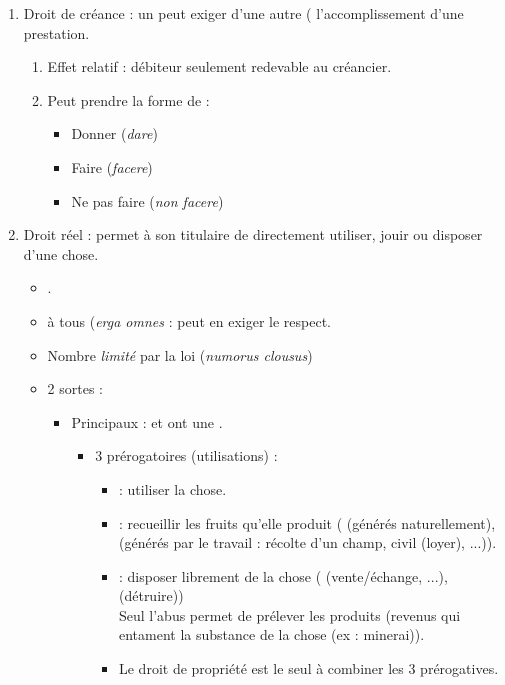 \begin{enumerate}
	\item Droit de créance : un  peut exiger d'une autre ( l'accomplissement d'une prestation.
	\begin{enumerate}
		\item Effet relatif : débiteur seulement redevable au créancier.
		\item Peut prendre la forme de :
		\begin{itemize}
			\item Donner (\textit{dare})
			\item Faire (\textit{facere})
			\item Ne pas faire (\textit{non facere})
		\end{itemize}
	\end{enumerate}
	\item Droit réel : permet à son titulaire de directement utiliser, jouir ou disposer d'une chose.
	\begin{itemize}
		\item {}.
	    \item {} à tous (\textit{erga omnes} : peut en exiger le respect.
	    \item Nombre \textit{limité} par la loi (\textit{numorus clousus})
	    \item 2 sortes :
	    \begin{itemize}
	    	    \item Principaux :  et ont une .
	    	    \begin{itemize}
	    	    	    \item 3 prérogatoires (utilisations) :
	    	    	    \begin{itemize}
	    	    	    	    \item {} : utiliser la chose.
	    	    	    	    \item {} : recueillir les fruits qu'elle produit ( (générés naturellement),  (générés par le travail : récolte d'un champ, civil (loyer), ...)).
	    	    	    	    \item {} : disposer librement de la chose ( (vente/échange, ...),  (détruire))\\
	    	    	    	    \textred{!} Seul l'abus permet de prélever les produits (revenus qui entament la substance de la chose (ex : minerai)).
	    	    	    	    \item Le droit de propriété est le seul à combiner les 3 prérogatives.

\end{itemize}
\end{itemize}
\end{itemize}
\end{itemize}
\end{enumerate}
